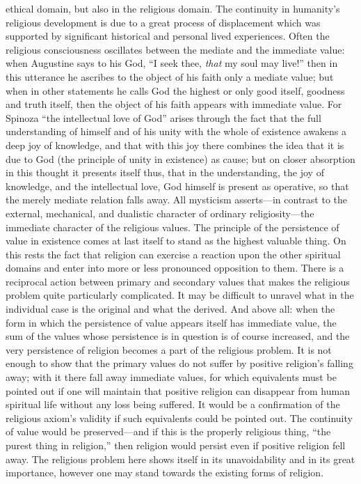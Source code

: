 \documentclass[12pt,a4paper]{book}
\newcommand{\opage}[1]{\marginnote{\footnotesize\textit{[#1]}}}
\begin{document}
ethical domain, but also in the religious domain. The continuity in humanity's religious development is
due to a great process of displacement which was supported by significant historical and personal lived
experiences. Often the religious consciousness oscillates between the mediate and the immediate value:
when Augustine says to his God, ``I seek thee, \emph{that} my soul may live!'' then in this utterance he
ascribes to the object of his faith only a mediate value; but when in other statements he calls God the
highest or only good itself, goodness and truth itself, then the object of his faith appears with
immediate value. For Spinoza ``the intellectual love of God'' arises through the fact that the full
understanding of himself and of his unity with the whole 
\opage{149}of existence awakens a deep joy of knowledge,
and that with this joy there combines the idea that it is due to God (the principle of unity in
existence) as cause; but on closer absorption in this thought it presents itself thus, that in the
understanding, the joy of knowledge, and the intellectual love, God himself is present as operative, so
that the merely mediate relation falls away. All mysticism asserts---in contrast to the external,
mechanical, and dualistic character of ordinary religiosity---the immediate character of the religious
values. The principle of the persistence of value in existence comes at last itself to stand as the
highest valuable thing. On this rests the fact that religion can exercise a reaction upon the other
spiritual domains and enter into more or less pronounced opposition to them. There is a reciprocal action
between primary and secondary values that makes the religious problem quite particularly complicated. It
may be difficult to unravel what in the individual case is the original and what the derived. And above
all: when the form in which the persistence of value appears itself has immediate value, the sum of the
values whose persistence is in question is of course increased, and the very persistence of religion
becomes a part of the religious problem. It is not enough to show that the primary values do not suffer
by positive religion's falling away; with it there fall away immediate values, for which equivalents
must be pointed out if one will maintain that positive religion can disappear from human spiritual life
without any loss being suffered. It would be a confirmation of the religious axiom's validity if such
equivalents could be pointed out. The continuity of value would be preserved---and if this is the
properly religious thing, ``the purest thing in religion,'' then religion would persist even if positive
religion fell away. The religious problem here shows itself in its unavoidability and in its great
importance, however one may stand towards the existing forms of religion.
\end{document}
